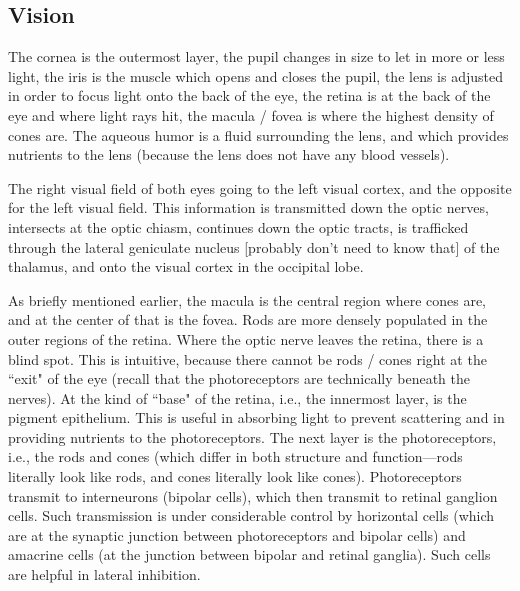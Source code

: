 \subsection{Vision}

The cornea is the outermost layer, the pupil changes in size to let in more or less light, the iris is the muscle which opens and closes the pupil, the lens is adjusted in order to focus light onto the back of the eye, the retina is at the back of the eye and where light rays hit, the macula / fovea is where the highest density of cones are. The aqueous humor is a fluid surrounding the lens, and which provides nutrients to the lens (because the lens does not have any blood vessels).\newline

The right visual field of both eyes going to the left visual cortex, and the opposite for the left visual field. This information is transmitted down the optic nerves, intersects at the optic chiasm, continues down the optic tracts, is trafficked through the lateral geniculate nucleus [probably don't need to know that] of the thalamus, and onto the visual cortex in the occipital lobe.\newline

As briefly mentioned earlier, the macula is the central region where cones are, and at the center of that is the fovea. Rods are more densely populated in the outer regions of the retina. Where the optic nerve leaves the retina, there is a blind spot. This is intuitive, because there cannot be rods / cones right at the ``exit" of the eye (recall that the photoreceptors are technically beneath the nerves). At the kind of ``base" of the retina, i.e., the innermost layer, is the pigment epithelium. This is useful in absorbing light to prevent scattering and in providing nutrients to the photoreceptors. The next layer is the photoreceptors, i.e., the rods and cones (which differ in both structure and function---rods literally look like rods, and cones literally look like cones). Photoreceptors transmit to interneurons (bipolar cells), which then transmit to retinal ganglion cells. Such transmission is under considerable control by horizontal cells (which are at the synaptic junction between photoreceptors and bipolar cells) and amacrine cells (at the junction between bipolar and retinal ganglia). Such cells are helpful in lateral inhibition. \newline

